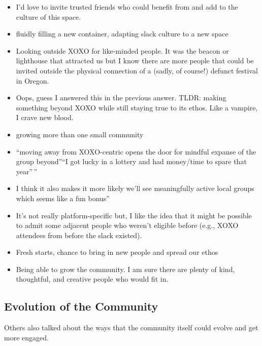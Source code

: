 \documentclass[
]{book}
\providecommand{\tightlist}{%
  \setlength{\itemsep}{0pt}\setlength{\parskip}{0pt}}
\begin{document}
\begin{itemize}
\tightlist
\item
  I'd love to invite trusted friends who could benefit from and add to the culture of this space.
\item
  fluidly filling a new container, adapting slack culture to a new space
\item
  Looking outside XOXO for like-minded people. It was the beacon or lighthouse that attracted us but I know there are more people that could be invited outside the physical connection of a (sadly, of course!) defunct festival in Oregon.
\item
  Oops, guess I answered this in the previous answer. TLDR: making something beyond XOXO while still staying true to its ethos. Like a vampire, I crave new blood.
\item
  growing more than one small community
\item
  ``moving away from XOXO-centric opens the door for mindful expanse of the group beyond''``I got lucky in a lottery and had money/time to spare that year''\,''
\item
  I think it also makes it more likely we'll see meaningfully active local groups which seems like a fun bonus''
\item
  It's not really platform-specific but, I like the idea that it might be possible to admit some adjacent people who weren't eligible before (e.g., XOXO attendees from before the slack existed).
\item
  Fresh starts, chance to bring in new people and spread our ethos
\item
  Being able to grow the community. I am sure there are plenty of kind, thoughtful, and creative people who would fit in.
\end{itemize}

\subsection{Evolution of the Community}\label{evolution-of-the-community}

Others also talked about the ways that the community itself could evolve and get more engaged.
\end{document}
